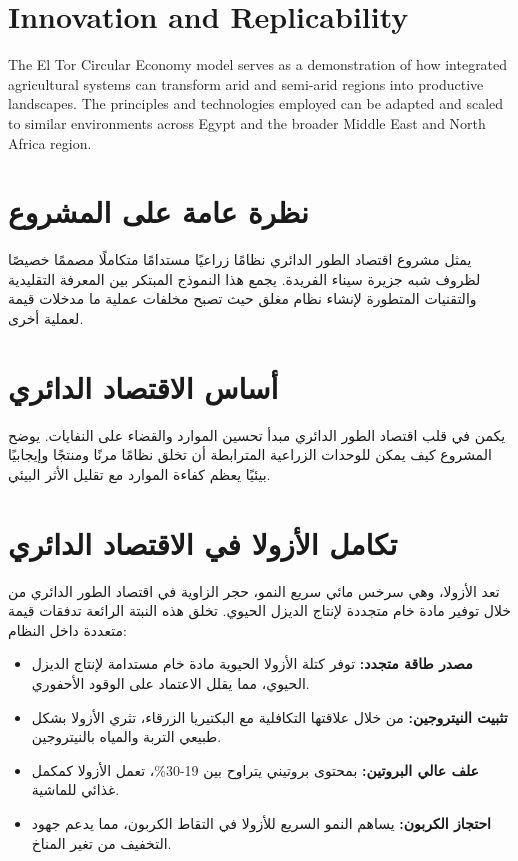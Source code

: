 \section{Innovation and Replicability}

The El Tor Circular Economy model serves as a demonstration of how integrated agricultural systems can transform arid and semi-arid regions into productive landscapes. The principles and technologies employed can be adapted and scaled to similar environments across Egypt and the broader Middle East and North Africa region.

\section{نظرة عامة على المشروع}

يمثل مشروع اقتصاد الطور الدائري نظامًا زراعيًا مستدامًا متكاملًا مصممًا خصيصًا لظروف شبه جزيرة سيناء الفريدة. يجمع هذا النموذج المبتكر بين المعرفة التقليدية والتقنيات المتطورة لإنشاء نظام مغلق حيث تصبح مخلفات عملية ما مدخلات قيمة لعملية أخرى.

\section{أساس الاقتصاد الدائري}

يكمن في قلب اقتصاد الطور الدائري مبدأ تحسين الموارد والقضاء على النفايات. يوضح المشروع كيف يمكن للوحدات الزراعية المترابطة أن تخلق نظامًا مرنًا ومنتجًا وإيجابيًا بيئيًا يعظم كفاءة الموارد مع تقليل الأثر البيئي.

\section{تكامل الأزولا في الاقتصاد الدائري}

تعد الأزولا، وهي سرخس مائي سريع النمو، حجر الزاوية في اقتصاد الطور الدائري من خلال توفير مادة خام متجددة لإنتاج الديزل الحيوي. تخلق هذه النبتة الرائعة تدفقات قيمة متعددة داخل النظام:

\begin{itemize}
    \item \textbf{مصدر طاقة متجدد:} توفر كتلة الأزولا الحيوية مادة خام مستدامة لإنتاج الديزل الحيوي، مما يقلل الاعتماد على الوقود الأحفوري.
    \item \textbf{تثبيت النيتروجين:} من خلال علاقتها التكافلية مع البكتيريا الزرقاء، تثري الأزولا بشكل طبيعي التربة والمياه بالنيتروجين.
    \item \textbf{علف عالي البروتين:} بمحتوى بروتيني يتراوح بين 19-30\%، تعمل الأزولا كمكمل غذائي للماشية.
    \item \textbf{احتجاز الكربون:} يساهم النمو السريع للأزولا في التقاط الكربون، مما يدعم جهود التخفيف من تغير المناخ.
\end{itemize}

